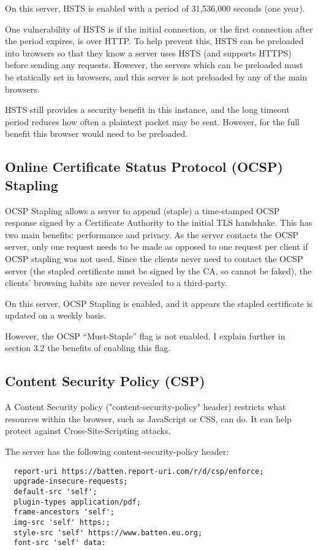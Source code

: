 \documentclass[12pt]{article}
\begin{document}
  On this server, HSTS is enabled with a period of 31,536,000 seconds (one year).

  One vulnerability of HSTS is if the initial connection, or the first connection after the period expires, is over HTTP.
  To help prevent this, HSTS can be preloaded into browsers so that they know a server uses HSTS (and supports HTTPS) before sending any requests.
  However, the servers which can be preloaded must be statically set in browsers, and this server is not preloaded by any of the main browsers.
  
  HSTS still provides a security benefit in this instance, and the long timeout period reduces how often a plaintext packet may be sent.
  However, for the full benefit this browser would need to be preloaded.

  \subsection{Online Certificate Status Protocol (OCSP) Stapling}
  OCSP Stapling allows a server to append (staple) a time-stamped OCSP response signed by a Certificate Authority to the initial TLS handshake.
  This has two main benefits: performance and privacy.
  As the server contacts the OCSP server, only one request needs to be made as opposed to one request per client if OCSP stapling was not used.
  Since the clients never need to contact the OCSP server (the stapled certificate must be signed by the CA, so cannot be faked), the clients' browsing habits are never revealed to a third-party.
  
  On this server, OCSP Stapling is enabled, and it appears the stapled certificate is updated on a weekly basis.

  However, the OCSP ``Must-Staple'' flag is not enabled.
  I explain further in section 3.2 the benefits of enabling this flag.

  \subsection{Content Security Policy (CSP)}
  A Content Security policy ("content-security-policy" header) restricts what resources within the browser, such as JavaScript or CSS, can do.
  It can help protect against Cross-Site-Scripting attacks.

  The server has the following content-security-policy header:
  \begin{verbatim}
  report-uri https://batten.report-uri.com/r/d/csp/enforce; 
  upgrade-insecure-requests; 
  default-src 'self'; 
  plugin-types application/pdf; 
  frame-ancestors 'self'; 
  img-src 'self' https:; 
  style-src 'self' https://www.batten.eu.org; 
  font-src 'self' data:
  \end{verbatim}
\end{document}
